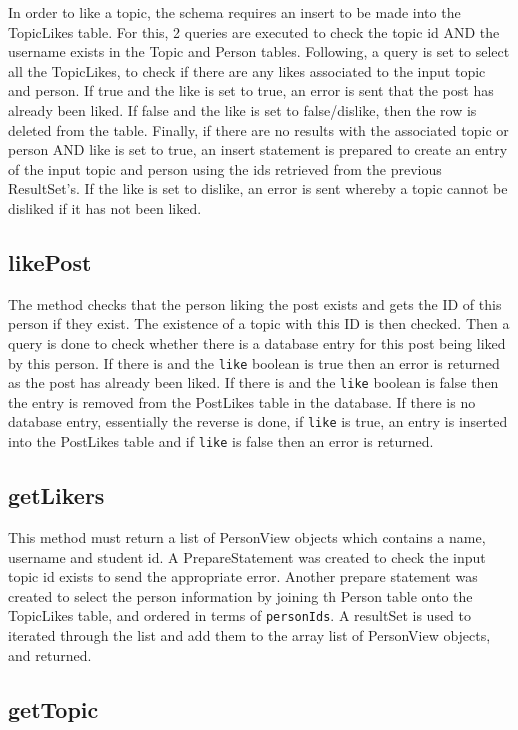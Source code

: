 \documentclass{article}
\begin{document}
In order to like a topic, the schema requires an insert to be made into the TopicLikes table. For this, 2 queries are executed to check the topic id AND the username exists in the Topic and Person tables. Following, a query is set to select all the TopicLikes, to check if there are any likes associated to the input topic and person. If true and the like is set to true, an error is sent that the post has already been liked. If false and the like is set to false/dislike, then the row is deleted from the table.
Finally, if there are no results with the associated topic or person AND like is set to true, an insert statement is prepared to create an entry of the input topic and person using the ids retrieved from the previous ResultSet’s. If the like is set to dislike, an error is sent whereby a topic cannot be disliked if it has not been liked.

\subsection*{likePost}

The method checks that the person liking the post exists and gets the ID of this person if they exist. The existence of a topic with this ID is then checked. Then a query is done to check whether there is a database entry for this post being liked by this person. If there is and the \texttt{like} boolean is true then an error is returned as the post has already been liked. If there is and the \texttt{like} boolean is false then the entry is removed from the PostLikes table in the database. If there is no database entry, essentially the reverse is done, if \texttt{like} is true, an entry is inserted into the PostLikes table and if \texttt{like} is false then an error is returned.

\subsection*{getLikers}

This method must return a list of PersonView objects which contains a name, username and student id. A PrepareStatement was created to check the input topic id exists to send the appropriate error. Another prepare statement was created to select the person information by joining th Person table onto the TopicLikes table, and ordered in terms of \texttt{personIds}. A resultSet is used to iterated through the list and add them to the array list of PersonView objects, and returned.

\subsection*{getTopic}
\end{document}
